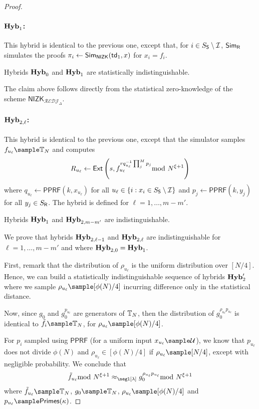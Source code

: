 \begin{proof}
\paragraph{$\mathsf{\mathbf{Hyb}}_1$:} This hybrid is identical to the previous one, except that, for $i\in S_{\mathsf{S}}\setminus \mathcal{I}$, $\mathsf{Sim}_{\mathsf{R}}$ simulates the proofs $\pi_i\leftarrow\mathsf{Sim}_\mathsf{NIZK}(\mathsf{td}_1,x)$ for $x_i=f_i$.

\begin{claim}
Hybrids $\mathsf{\mathbf{Hyb}}_0$ and $\mathsf{\mathbf{Hyb}}_1$ are statistically indistinguishable.
\end{claim}

The claim above follows directly from the statistical zero-knowledge of the scheme $\mathsf{NIZK}_{\mathcal{REDJ}_\Delta}$.

\paragraph{$\mathsf{\mathbf{Hyb}}_{2,\ell}$:} This hybrid is identical to the previous one, except that the simulator samples $f_{u_\ell}\sample \TT_N$ and computes $$R_{u_\ell}\leftarrow\mathsf{Ext}\left(s,f_{u_\ell}^{rq_{u_\ell}^{-1}\prod_j^M p_j}\!\!\!\!\mod N^{\xi+1}\right)$$ where $q_{u_\ell}\leftarrow\mathsf{PPRF}(k,x_{u_\ell})$ for all $u_\ell\in \{i:x_i\in S_{\mathsf{S}}\setminus \mathcal{I} \}$ and $p_j\leftarrow\mathsf{PPRF}(k,y_j)$ for all $y_j\in S_{\mathsf{R}}$. The hybrid is defined for $\ell=1,\dots, m-m'$.


\begin{claim}
\label{claim:2to3ReceiverLPSI}
 Hybrids $\mathsf{\mathbf{Hyb}}_1$ and $\mathsf{\mathbf{Hyb}}_{2,m-m'}$ are indistinguishable.
\end{claim}



We prove that hybrids $\mathsf{\mathbf{Hyb}}_{2,\ell-1}$ and $\mathsf{\mathbf{Hyb}}_{2,\ell}$ are indistinguishable for $\ell=1,\dots , m-m'$ and where $\mathsf{\mathbf{Hyb}}_{2,0}=\mathsf{\mathbf{Hyb}}_1$.


First, remark that the distribution of $\rho_{u_\ell}$ is the uniform distribution over $[N/4]$.
Hence, we can build a statistically indistinguishable sequence of hybrids $\mathsf{\mathbf{Hyb}}_2'$ where we sample $\rho_{u_\ell}\sample [\phi(N)/4]$ incurring difference only in the statistical distance.

Now, since $g_0$ and $g_0^{p_{u_\ell}}$ are generators of $\mathbb{T}_N$, %
then the distribution of $g_0^{\rho_{u_\ell} p_{u_\ell}}$ is identical to $\tilde f_i\sample \TT_N$, for $\rho_{u_\ell}\sample [\phi(N)/4]$. 

For $p_i$ sampled using $\mathsf{PPRF}$ (for a uniform input $x_{u_\ell}\sample \Uc$), we know that $p_{u_\ell}$  does not divide $\phi(N)$ and $\rho_{u_\ell} \in[\phi(N)/4]$ if $\rho_{u_\ell}\sample [N/4]$, except with negligible probability. We conclude that $$\tilde f_{u_\ell} \smod N^{\xi+1}\approx_{\negl[\lambda]} g_0^{\rho_{u_\ell}p_{u_\ell}}\smod N^{\xi+1}$$ where $\tilde f_{u_\ell}\sample \TT_N$, $g_0\sample \TT_N$, $\rho_{u_\ell}\sample [\phi(N)/4]$ and $p_{u_\ell}\sample \mathsf{Primes}(\kappa)$.


\end{proof}
